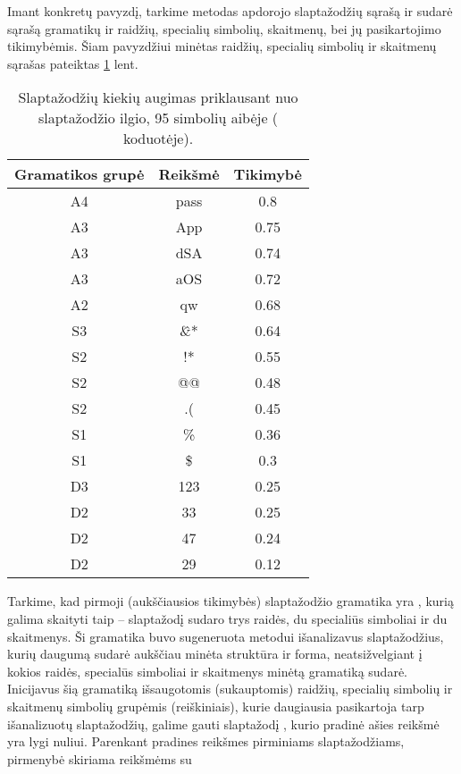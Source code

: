 \documentclass{VUMIFInfBakalaurinis}
\begin{document}
Imant konkretų pavyzdį, tarkime metodas apdorojo slaptažodžių sąrašą ir sudarė 
sąrašą gramatikų ir raidžių, specialių simbolių, skaitmenų, bei jų pasikartojimo 
tikimybėmis. Šiam pavyzdžiui minėtas raidžių, specialių simbolių ir skaitmenų 
sąrašas pateiktas \ref{tab:pcfgvalues} lent.
\begin{table}[hb]
  \centering
  \caption{
    Slaptažodžių kiekių augimas priklausant nuo slaptažodžio ilgio, 95 simbolių 
    aibėje ( koduotėje).
  }
  \begin{tabular}{|c|c|c|}
    \hline \textbf{Gramatikos grupė} & \textbf{Reikšmė} & \textbf{Tikimybė} \\
    \hline A4 & pass & 0.8 \\
    \hline A3 & App & 0.75 \\
    \hline A3 & dSA & 0.74 \\
    \hline A3 & aOS & 0.72 \\
    \hline A2 & qw & 0.68 \\
    \hline S3 & \^\&* & 0.64 \\
    \hline S2 & !* & 0.55 \\
    \hline S2 & @@ & 0.48 \\
    \hline S2 & .( & 0.45 \\
    \hline S1 & \% & 0.36 \\
    \hline S1 & \$ & 0.3 \\
    \hline D3 & 123 & 0.25 \\
    \hline D2 & 33 & 0.25 \\
    \hline D2 & 47 & 0.24 \\
    \hline D2 & 29 & 0.12 \\
    \hline
  \end{tabular}
  \label{tab:pcfgvalues}
\end{table}
Tarkime, kad pirmoji (aukščiausios tikimybės) slaptažodžio gramatika yra 
, kurią galima skaityti taip -- slaptažodį sudaro trys raidės, 
du specialiūs simboliai ir du skaitmenys. Ši gramatika buvo sugeneruota metodui 
išanalizavus slaptažodžius, kurių daugumą sudarė aukščiau minėta struktūra ir 
forma, neatsižvelgiant į kokios raidės, specialūs simboliai ir skaitmenys minėtą 
gramatiką sudarė. Inicijavus šią gramatiką išsaugotomis (sukauptomis) raidžių, 
specialių simbolių ir skaitmenų simbolių grupėmis (reiškiniais), kurie 
daugiausia pasikartoja tarp išanalizuotų slaptažodžių, galime gauti slaptažodį 
, kurio pradinė ašies reikšmė yra lygi nuliui. Parenkant 
pradines reikšmes pirminiams slaptažodžiams, pirmenybė skiriama reikšmėms su 
\end{document}
